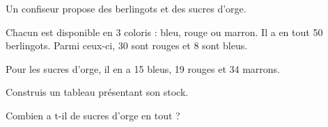 Un confiseur propose des berlingots et des sucres d'orge.\par Chacun
est disponible en 3 coloris : bleu, rouge ou marron. Il a en tout 50
berlingots. Parmi ceux-ci, 30 sont rouges et 8 sont bleus.\par Pour
les sucres d'orge, il en a 15 bleus, 19 rouges et 34 marrons.
\begin{myenumerate}
  \item Construis un tableau présentant son stock.
  \item Combien a t-il de sucres d'orge en tout ?
\end{myenumerate}
